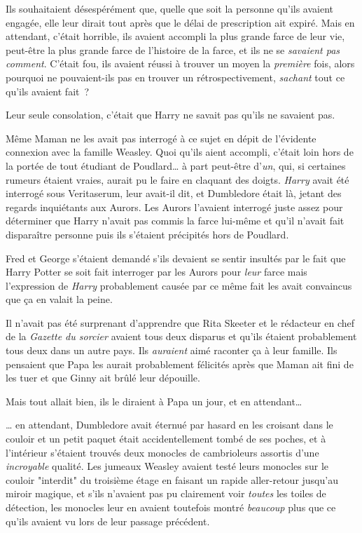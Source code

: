Ils souhaitaient désespérément que, quelle que soit la personne qu'ils avaient engagée, elle leur dirait tout après que le délai de prescription ait expiré. Mais en attendant, c'était horrible, ils avaient accompli la plus grande farce de leur vie, peut-être la plus grande farce de l'histoire de la farce, et ils ne se \emph{savaient pas comment}. C'était fou, ils avaient réussi à trouver un moyen la \emph{première} fois, alors pourquoi ne pouvaient-ils pas en trouver un rétrospectivement, \emph{sachant} tout ce qu'ils avaient fait~?

Leur seule consolation, c'était que Harry ne savait pas qu'ils ne savaient pas.

Même Maman ne les avait pas interrogé à ce sujet en dépit de l'évidente connexion avec la famille Weasley. Quoi qu'ils aient accompli, c'était loin hors de la portée de tout étudiant de Poudlard… à part peut-être d'\emph{un}, qui, si certaines rumeurs étaient vraies, aurait pu le faire en claquant des doigts. \emph{Harry} avait été interrogé sous Veritaserum, leur avait-il dit, et Dumbledore était là, jetant des regards inquiétants aux Aurors. Les Aurors l'avaient interrogé juste assez pour déterminer que Harry n'avait pas commis la farce lui-même et qu'il n'avait fait disparaître personne puis ils s'étaient précipités hors de Poudlard.

Fred et George s'étaient demandé s'ils devaient se sentir insultés par le fait que Harry Potter se soit fait interroger par les Aurors pour \emph{leur} farce mais l'expression de \emph{Harry} probablement causée par ce même fait les avait convaincus que ça en valait la peine.

Il n'avait pas été surprenant d'apprendre que Rita Skeeter et le rédacteur en chef de la \emph{Gazette du sorcier} avaient tous deux disparus et qu'ils étaient probablement tous deux dans un autre pays. Ils \emph{auraient} aimé raconter ça à leur famille. Ils pensaient que Papa les aurait probablement félicités après que Maman ait fini de les tuer et que Ginny ait brûlé leur dépouille.

Mais tout allait bien, ils le diraient à Papa un jour, et en attendant…

… en attendant, Dumbledore avait éternué par hasard en les croisant dans le couloir et un petit paquet était accidentellement tombé de ses poches, et à l'intérieur s'étaient trouvés deux monocles de cambrioleurs assortis d'une \emph{incroyable} qualité. Les jumeaux Weasley avaient testé leurs monocles sur le couloir "interdit" du troisième étage en faisant un rapide aller-retour jusqu'au miroir magique, et s'ils n'avaient pas pu clairement voir \emph{toutes} les toiles de détection, les monocles leur en avaient toutefois montré \emph{beaucoup} plus que ce qu'ils avaient vu lors de leur passage précédent.

